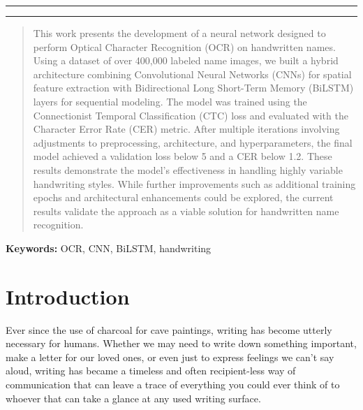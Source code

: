 \documentclass[11pt,letterpaper]{article}
\begin{document}
	
	\rule{17cm}{0.1mm}
	
	\authorrowtwo
	{}
	{}
	
	\authorrowtwo
	{}
	{}
	
	\rule{17cm}{0.1mm}
	
	\begin{abstract}
		This work presents the development of a neural network designed to perform Optical Character Recognition (OCR) on handwritten names. Using a dataset of over 400,000 labeled name images, we built a hybrid architecture combining Convolutional Neural Networks (CNNs) for spatial feature extraction with Bidirectional Long Short-Term Memory (BiLSTM) layers for sequential modeling. The model was trained using the Connectionist Temporal Classification (CTC) loss and evaluated with the Character Error Rate (CER) metric. After multiple iterations involving adjustments to preprocessing, architecture, and hyperparameters, the final model achieved a validation loss below 5 and a CER below 1.2. These results demonstrate the model’s effectiveness in handling highly variable handwriting styles. While further improvements such as additional training epochs and architectural enhancements could be explored, the current results validate the approach as a viable solution for handwritten name recognition.
	\end{abstract}
	
	\smallskip
	\noindent\textbf{Keywords: } OCR, CNN, BiLSTM, handwriting
	
	\section{Introduction}
	Ever since the use of charcoal for cave paintings, writing has become utterly necessary for humans. Whether we may need to write down something important, make a letter for our loved ones, or even just to express feelings we can't say aloud, writing has became a timeless and often recipient-less way of communication that can leave a trace of everything you could ever think of to whoever that can take a glance at any used writing surface.
	
\end{document}
